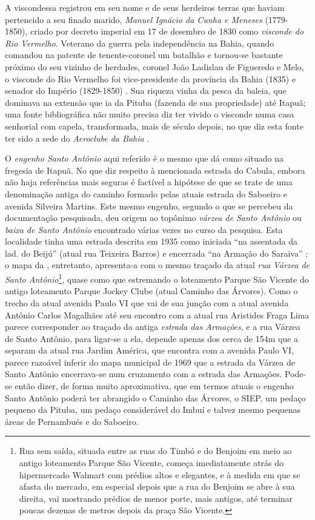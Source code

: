 A viscondessa registrou em seu nome e de seus herdeiros terras que haviam pertencido a seu finado marido, \textit{Manuel Ignácio da Cunha e Meneses} (1779-1850), criado por decreto imperial em 17 de desembro de 1830 como \textit{visconde do Rio Vermelho}. Veterano da guerra pela independência na Bahia, quando comandou na patente de tenente-coronel um batalhão e tornou-se bastante próximo do seu vizinho de herdades, coronel João Ladislau de Figueredo e Melo, o visconde do Rio Vermelho foi vice-presidente da província da Bahia (1835) e senador do Império (1829-1850) \cite[p.~404]{vasconcellos_arnobili_1918}. Sua riqueza vinha da pesca da baleia, que dominava na extensão que ia da Pituba (fazenda de sua propriedade) até Itapuã; uma fonte bibliográfica não muito precisa diz ter vivido o visconde numa casa senhorial com capela, transformada, mais de século depois, no que diz esta fonte ter sido a sede do \textit{Aeroclube da Bahia} \cite{riserio_histba_2004}.

O \textit{engenho Santo Antônio} aqui referido é o mesmo que  dá como situado na fregesia de Itapuã. No que diz respeito à mencionada estrada do Cabula, embora não haja referências mais seguras é factível a hipótese de que se trate de uma denominação antiga do caminho formado pelas atuais estrada do Saboeiro e avenida Silveira Martins. Este mesmo engenho, segundo o que se percebeu da documentação pesquisada, deu origem ao topônimo \textit{várzea de Santo Antônio} ou \textit{baixa de Santo Antônio} encontrado várias vezes no curso da pesquisa. Esta localidade tinha uma estrada descrita em 1935 como iniciada ``na assentada da lad. do Beijú'' (atual rua Teixeira Barros) e encerrada ``na Armação do Saraiva'' \cite[p.~142]{souza_guia_1935}; o mapa da , entretanto, apresenta-a com o mesmo traçado da atual \textit{rua Várzea de Santo Antônio}\footnote{Rua sem saída, situada entre as ruas do Timbó e do Benjoim em meio ao antigo loteamento Parque São Vicente, começa imediatamente atrás do hipermercado Walmart com prédios altos e elegantes, e à medida em que se afasta do mercado, em especial depois que a rua do Benjoim se abre à sua direita, vai mostrando prédios de menor porte, mais antigos, até terminar poucas dezenas de metros depois da praça São Vicente.}, quase como que estremando o loteamento Parque São Vicente do antigo loteamento Parque Jockey Clube (atual Caminho das Árvores). Como o trecho da atual avenida Paulo VI que vai de sua junção com a atual avenida Antônio Carlos Magalhães até seu encontro com a atual rua Aristides Fraga Lima parece corresponder ao traçado da antiga \textit{estrada das Armações}, e a rua Várzea de Santo Antônio, para ligar-se a ela, depende apenas dos cerca de 154m que a separam da atual rua Jardim América, que encontra com a avenida Paulo VI, parece razoável inferir do mapa municipal de 1969 que a estrada da Várzea de Santo Antônio encerrava-se num cruzamento com a estrada das Armações. Pode-se então dizer, de forma muito aproximativa, que em termos atuais o engenho Santo Antônio poderá ter abrangido o Caminho das Árvores, o SIEP, um pedaço pequeno da Pituba, um pedaço considerável do Imbuí e talvez mesmo pequenas áreas de Pernambués e do Saboeiro.


